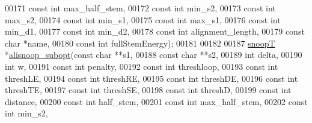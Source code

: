 \begin{DoxyCode}
00171                      \textcolor{keyword}{const} \textcolor{keywordtype}{int}  max\_half\_stem,
00172                      \textcolor{keyword}{const} \textcolor{keywordtype}{int}  min\_s2,
00173                      \textcolor{keyword}{const} \textcolor{keywordtype}{int}  max\_s2,
00174                      \textcolor{keyword}{const} \textcolor{keywordtype}{int}  min\_s1,
00175                      \textcolor{keyword}{const} \textcolor{keywordtype}{int}  max\_s1,
00176                      \textcolor{keyword}{const} \textcolor{keywordtype}{int}  min\_d1,
00177                      \textcolor{keyword}{const} \textcolor{keywordtype}{int}  min\_d2,
00178                      \textcolor{keyword}{const} \textcolor{keywordtype}{int}  alignment\_length,
00179                      \textcolor{keyword}{const} \textcolor{keywordtype}{char} *name,
00180                      \textcolor{keyword}{const} \textcolor{keywordtype}{int}  fullStemEnergy);
00181 
00182 
00187 \mbox{\hyperlink{group__data__structures_structsnoop_t}{snoopT}} *\mbox{\hyperlink{snoop_8h_aca44405ddd6f4df6661a7f0e0c228dc1}{alisnoop\_subopt}}(\textcolor{keyword}{const} \textcolor{keywordtype}{char}  **s1,
00188                         \textcolor{keyword}{const} \textcolor{keywordtype}{char}  **s2,
00189                         \textcolor{keywordtype}{int}         delta,
00190                         \textcolor{keywordtype}{int}         w,
00191                         \textcolor{keyword}{const} \textcolor{keywordtype}{int}   penalty,
00192                         \textcolor{keyword}{const} \textcolor{keywordtype}{int}   threshloop,
00193                         \textcolor{keyword}{const} \textcolor{keywordtype}{int}   threshLE,
00194                         \textcolor{keyword}{const} \textcolor{keywordtype}{int}   threshRE,
00195                         \textcolor{keyword}{const} \textcolor{keywordtype}{int}   threshDE,
00196                         \textcolor{keyword}{const} \textcolor{keywordtype}{int}   threshTE,
00197                         \textcolor{keyword}{const} \textcolor{keywordtype}{int}   threshSE,
00198                         \textcolor{keyword}{const} \textcolor{keywordtype}{int}   threshD,
00199                         \textcolor{keyword}{const} \textcolor{keywordtype}{int}   distance,
00200                         \textcolor{keyword}{const} \textcolor{keywordtype}{int}   half\_stem,
00201                         \textcolor{keyword}{const} \textcolor{keywordtype}{int}   max\_half\_stem,
00202                         \textcolor{keyword}{const} \textcolor{keywordtype}{int}   min\_s2,

\end{DoxyCode}
